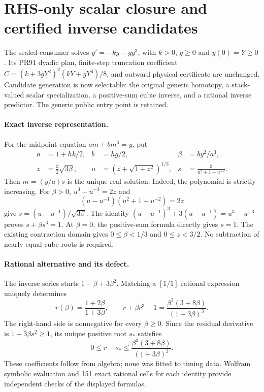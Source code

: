 \section{RHS-only scalar closure and certified inverse candidates}
The sealed consumer solves $y'=-ky-gy^3$, with $k>0$, $g\geq0$ and
$y(0)=Y\geq0$.  Its PR91 dyadic plan, finite-step truncation coefficient
$C=(k+3gY^2)^2(kY+gY^3)/8$, and outward physical certificate are unchanged.
Candidate generation is now selectable: the original generic homotopy,
a stack-valued scalar specialization, a positive-sum cubic inverse, and a
rational inverse predictor.  The generic public entry point is retained.

\paragraph{Exact inverse representation.}
For the midpoint equation $am+bm^3=y$, put
\begin{align}
 a&=1+hk/2,& b&=hg/2,& \beta&=by^2/a^3,\\
 z&=\tfrac32\sqrt{3\beta},&
 u&=(z+\sqrt{1+z^2})^{1/3},&
 s&=\frac{3}{u^2+1+u^{-2}}.
\end{align}
Then $m=(y/a)s$ is the unique real solution.  Indeed, the polynomial is
strictly increasing.  For $\beta>0$, $u^3-u^{-3}=2z$ and
\begin{equation}
 (u-u^{-1})(u^2+1+u^{-2})=2z
\end{equation}
give $s=(u-u^{-1})/\sqrt{3\beta}$.  The identity
$(u-u^{-1})^3+3(u-u^{-1})=u^3-u^{-3}$ proves $s+\beta s^3=1$.
At $\beta=0$, the positive-sum formula directly gives $s=1$.
The existing contraction domain gives $0\leq\beta<1/3$ and $0\leq z<3/2$.
No subtraction of nearly equal cube roots is required.

\paragraph{Rational alternative and its defect.}
The inverse series starts $1-\beta+3\beta^2$.  Matching a $[1/1]$
rational expression uniquely determines
\begin{equation}
 r(\beta)=\frac{1+2\beta}{1+3\beta},\qquad
 r+\beta r^3-1=\frac{\beta^3(3+8\beta)}{(1+3\beta)^3}.
\end{equation}
The right-hand side is nonnegative for every $\beta\geq0$.  Since the
residual derivative is $1+3\beta s^2\geq1$, its unique positive root $s_*$
satisfies
\begin{equation}
 0\leq r-s_*\leq\frac{\beta^3(3+8\beta)}{(1+3\beta)^3}.
\end{equation}
These coefficients follow from algebra; none was fitted to timing data.
Wolfram symbolic evaluation and 151 exact rational cells for each identity
provide independent checks of the displayed formulas.

